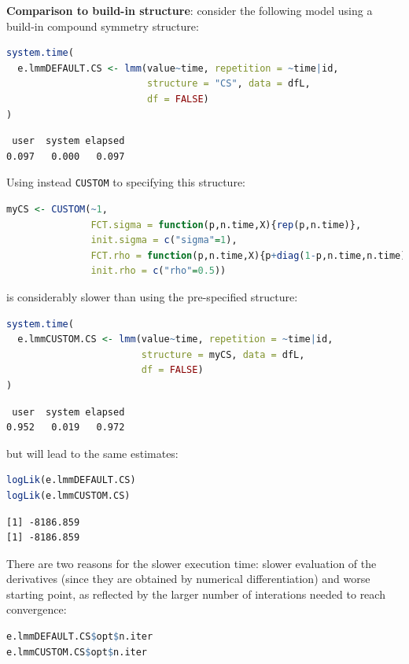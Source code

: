 \documentclass[12pt]{article}
\begin{document}
\textbf{Comparison to build-in structure}: consider the following model using
a build-in compound symmetry structure:
\begin{lstlisting}[language=r,numbers=none]
system.time(
  e.lmmDEFAULT.CS <- lmm(value~time, repetition = ~time|id,
                         structure = "CS", data = dfL,
                         df = FALSE)
)
\end{lstlisting}

\label{}
\begin{verbatim}
 user  system elapsed 
0.097   0.000   0.097
\end{verbatim}


Using instead \texttt{CUSTOM} to specifying this structure:
\begin{lstlisting}[language=r,numbers=none]
myCS <- CUSTOM(~1,
               FCT.sigma = function(p,n.time,X){rep(p,n.time)},
               init.sigma = c("sigma"=1), 
               FCT.rho = function(p,n.time,X){p+diag(1-p,n.time,n.time)},
               init.rho = c("rho"=0.5))
\end{lstlisting}

is considerably slower than using the pre-specified structure:
\begin{lstlisting}[language=r,numbers=none]
system.time(
  e.lmmCUSTOM.CS <- lmm(value~time, repetition = ~time|id,
                        structure = myCS, data = dfL,
                        df = FALSE)
)
\end{lstlisting}

\label{}
\begin{verbatim}
 user  system elapsed 
0.952   0.019   0.972
\end{verbatim}



but will lead to the same estimates:
\begin{lstlisting}[language=r,numbers=none]
logLik(e.lmmDEFAULT.CS)
logLik(e.lmmCUSTOM.CS)
\end{lstlisting}

\label{}
\begin{verbatim}
[1] -8186.859
[1] -8186.859
\end{verbatim}


There are two reasons for the slower execution time: slower evaluation
of the derivatives (since they are obtained by numerical
differentiation) and worse starting point, as reflected by the larger
number of interations needed to reach convergence:
\begin{lstlisting}[language=r,numbers=none]
e.lmmDEFAULT.CS$opt$n.iter
e.lmmCUSTOM.CS$opt$n.iter
\end{lstlisting}
\end{document}
